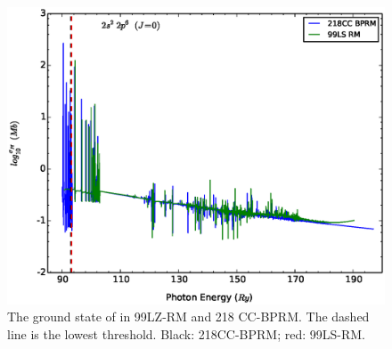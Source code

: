 \begin{figure}
	\centering
	\includegraphics[width=.9\textwidth]{figures_chap_4/fe17_ground_99_218}	
	\caption{The ground state of  in 99LZ-RM and 218 CC-BPRM. The dashed line is the lowest threshold. Black: 218CC-BPRM; red: 99LS-RM. }
	\label{figure_bound_99_218}
\end{figure}


